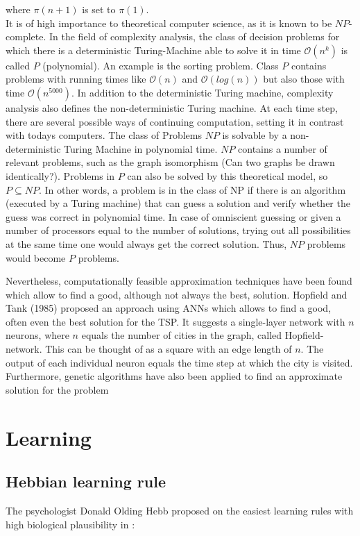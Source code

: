 \documentclass[10pt,a4paper,DIV=11]{scrreprt}
\begin{document}
where $\pi(n+1)$ is set to $\pi(1)$.\cite{MATHINF}\\

It is of high importance to theoretical computer science, as it is known to be $NP$-complete. In the field of complexity analysis, the class of decision problems for which there is a deterministic Turing-Machine able to solve it in time $\mathcal{O}(n^k)$ is called $P$ (polynomial). An example is the sorting problem. Class $P$ contains problems with running times like $\mathcal{O}(n)$ and $\mathcal{O}(log(n))$ but also those with time $\mathcal{O}(n^{5000})$. In addition to the deterministic Turing machine, complexity analysis also defines the non-deterministic Turing machine. At each time step, there are several possible ways of continuing computation, setting it in contrast with todays computers. The class of Problems $NP$ is solvable by a non-deterministic Turing Machine in polynomial time. $NP$ contains a number of relevant problems, such as the graph isomorphism (Can two graphs be drawn identically?). Problems in $P$ can also be solved by this theoretical model, so $P \subseteq NP$. In other words, a problem is in the class of NP if there is an algorithm (executed by a Turing machine) that can guess a solution and verify whether the guess was correct in polynomial time. In case of omniscient guessing or given a number of processors equal to the number of solutions, trying out all possibilities at the same time one would always get the correct solution. Thus, $NP$ problems would become $P$ problems. 

Nevertheless, computationally feasible approximation techniques have been found which allow to find a good, although not always the best, solution. Hopfield and Tank (1985) proposed an approach using ANNs which allows to find a good, often even the best solution for the TSP. It suggests a single-layer network with $n$ neurons, where $n$ equals the number of cities in the graph, called Hopfield-network. This can be thought of as a square with an edge length of $n$. The output of each individual neuron equals the time step at which the city is visited. Furthermore, genetic algorithms have also been applied to find an approximate solution for the problem %


\chapter{Learning}\label{sec:learning}
\section{Hebbian learning rule}
The psychologist Donald Olding Hebb proposed on the easiest learning rules with high biological plausibility in \cite{HEBB}:\\
\end{document}
